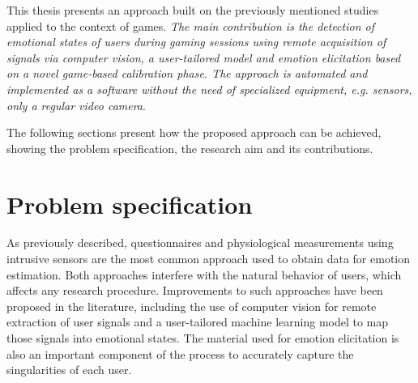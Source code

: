 This thesis presents an approach built on the previously mentioned studies applied to the context of games. \textit{The main contribution is the detection of emotional states of users during gaming sessions using remote acquisition of signals via computer vision, a user-tailored model and emotion elicitation based on a novel game-based calibration phase. The approach is automated and implemented as a software without the need of specialized equipment, e.g. sensors, only a regular video camera}.


The following sections present how the proposed approach can be achieved, showing the problem specification, the research aim and its contributions.

\section{Problem specification}
\label{sec:problem-specification}

As previously described, questionnaires and physiological measurements using intrusive sensors are the most common approach used to obtain data for emotion estimation. Both approaches interfere with the natural behavior of users, which affects any research procedure. Improvements to such approaches have been proposed in the literature, including the use of computer vision for remote extraction of user signals and a user-tailored machine learning model to map those signals into emotional states. The material used for emotion elicitation is also an important component of the process to accurately capture the singularities of each user.

